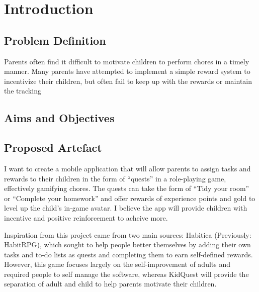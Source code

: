 

\chapter{Introduction}
\label{chap:intro}

\section{Problem Definition}
Parents often find it difficult to motivate children to perform chores in a timely manner. 
Many parents have attempted to implement a simple reward system to incentivize their children, but often fail to keep up with the rewards or maintain the tracking  

\section{Aims and Objectives}

\section{Proposed Artefact}
I want to create a mobile application that will allow parents to assign tasks and rewards to their children in the form of ``quests'' in a role-playing game, effectively gamifying chores. 
The quests can take the form of “Tidy your room” or “Complete your homework” and offer rewards of experience points and gold to level up the child's in-game avatar. 
I believe the app will provide children with incentive and positive reinforcement to acheive more.

Inspiration from this project came from two main sources: Habitica (Previously: HabitRPG), which sought to help people better themselves by adding their own tasks and to-do lists as quests and completing them to earn self-defined rewards. 
However, this game focuses largely on the self-improvement of adults and required people to self manage the software, whereas KidQuest will provide the separation of adult and child to help parents motivate their children.

